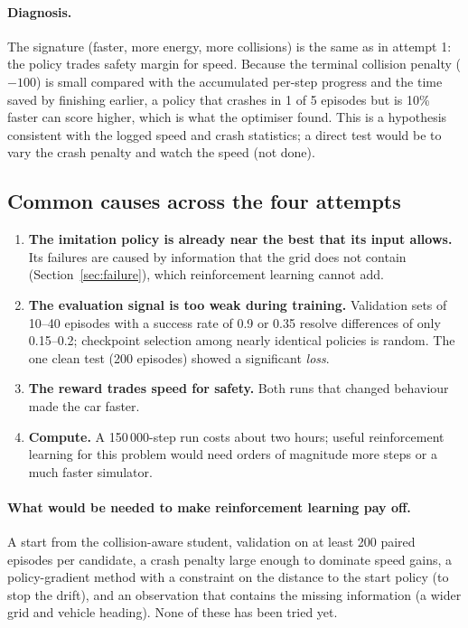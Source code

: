 \paragraph{Diagnosis.} The signature (faster, more energy, more collisions) is the same as in attempt 1: the policy trades safety margin for speed. Because the terminal collision penalty ($-100$) is small compared with the accumulated per-step progress and the time saved by finishing earlier, a policy that crashes in 1 of 5 episodes but is 10\% faster can score higher, which is what the optimiser found.
This is a hypothesis consistent with the logged speed and crash statistics; a direct test would be to vary the crash penalty and watch the speed (not done).

\subsection{Common causes across the four attempts}
\begin{enumerate}
\item \textbf{The imitation policy is already near the best that its input allows.} Its failures are caused by information that the grid does not contain (Section~\ref{sec:failure}), which reinforcement learning cannot add.
\item \textbf{The evaluation signal is too weak during training.} Validation sets of 10--40 episodes with a success rate of 0.9 or 0.35 resolve differences of only 0.15--0.2; checkpoint selection among nearly identical policies is random. The one clean test (200 episodes) showed a significant \emph{loss}.
\item \textbf{The reward trades speed for safety.} Both runs that changed behaviour made the car faster.
\item \textbf{Compute.} A 150\,000-step run costs about two hours; useful reinforcement learning for this problem would need orders of magnitude more steps or a much faster simulator.
\end{enumerate}
\paragraph{What would be needed to make reinforcement learning pay off.} A start from the collision-aware student, validation on at least 200 paired episodes per candidate, a crash penalty large enough to dominate speed gains, a policy-gradient method with a constraint on the distance to the start policy (to stop the drift), and an observation that contains the missing information (a wider grid and vehicle heading). None of these has been tried yet.
